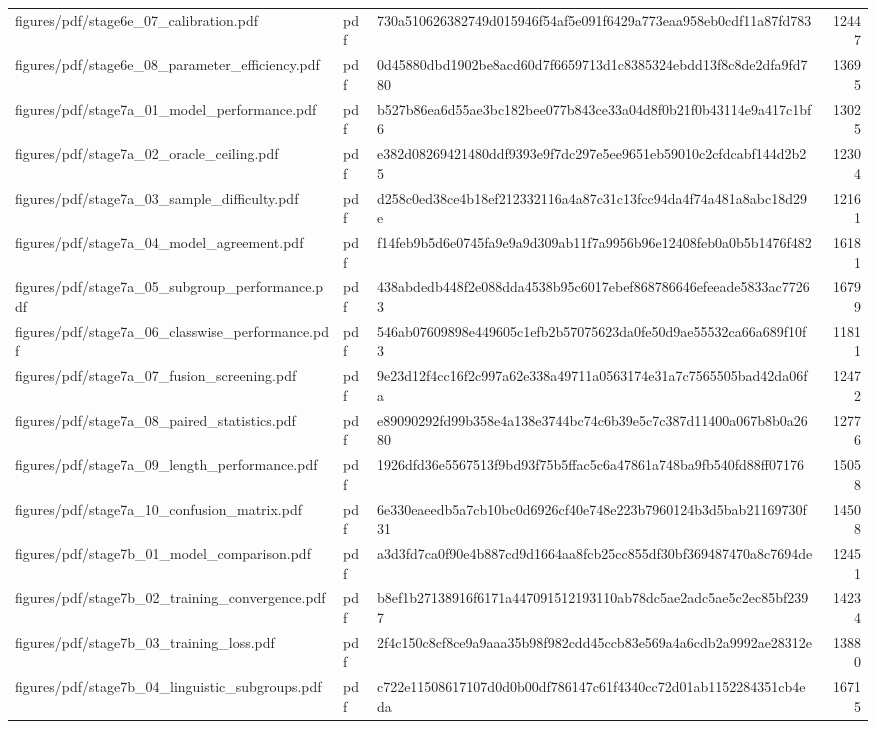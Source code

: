 \begin{tabular}{lllr}
figures/pdf/stage6e_07_calibration.pdf & pdf & 730a510626382749d015946f54af5e091f6429a773eaa958eb0cdf11a87fd783 & 12447 \\
figures/pdf/stage6e_08_parameter_efficiency.pdf & pdf & 0d45880dbd1902be8acd60d7f6659713d1c8385324ebdd13f8c8de2dfa9fd780 & 13695 \\
figures/pdf/stage7a_01_model_performance.pdf & pdf & b527b86ea6d55ae3bc182bee077b843ce33a04d8f0b21f0b43114e9a417c1bf6 & 13025 \\
figures/pdf/stage7a_02_oracle_ceiling.pdf & pdf & e382d08269421480ddf9393e9f7dc297e5ee9651eb59010c2cfdcabf144d2b25 & 12304 \\
figures/pdf/stage7a_03_sample_difficulty.pdf & pdf & d258c0ed38ce4b18ef212332116a4a87c31c13fcc94da4f74a481a8abc18d29e & 12161 \\
figures/pdf/stage7a_04_model_agreement.pdf & pdf & f14feb9b5d6e0745fa9e9a9d309ab11f7a9956b96e12408feb0a0b5b1476f482 & 16181 \\
figures/pdf/stage7a_05_subgroup_performance.pdf & pdf & 438abdedb448f2e088dda4538b95c6017ebef868786646efeeade5833ac77263 & 16799 \\
figures/pdf/stage7a_06_classwise_performance.pdf & pdf & 546ab07609898e449605c1efb2b57075623da0fe50d9ae55532ca66a689f10f3 & 11811 \\
figures/pdf/stage7a_07_fusion_screening.pdf & pdf & 9e23d12f4cc16f2c997a62e338a49711a0563174e31a7c7565505bad42da06fa & 12472 \\
figures/pdf/stage7a_08_paired_statistics.pdf & pdf & e89090292fd99b358e4a138e3744bc74c6b39e5c7c387d11400a067b8b0a2680 & 12776 \\
figures/pdf/stage7a_09_length_performance.pdf & pdf & 1926dfd36e5567513f9bd93f75b5ffac5c6a47861a748ba9fb540fd88ff07176 & 15058 \\
figures/pdf/stage7a_10_confusion_matrix.pdf & pdf & 6e330eaeedb5a7cb10bc0d6926cf40e748e223b7960124b3d5bab21169730f31 & 14508 \\
figures/pdf/stage7b_01_model_comparison.pdf & pdf & a3d3fd7ca0f90e4b887cd9d1664aa8fcb25cc855df30bf369487470a8c7694de & 12451 \\
figures/pdf/stage7b_02_training_convergence.pdf & pdf & b8ef1b27138916f6171a447091512193110ab78dc5ae2adc5ae5c2ec85bf2397 & 14234 \\
figures/pdf/stage7b_03_training_loss.pdf & pdf & 2f4c150c8cf8ce9a9aaa35b98f982cdd45ccb83e569a4a6cdb2a9992ae28312e & 13880 \\
figures/pdf/stage7b_04_linguistic_subgroups.pdf & pdf & c722e11508617107d0d0b00df786147c61f4340cc72d01ab1152284351cb4eda & 16715 \\

\end{tabular}
